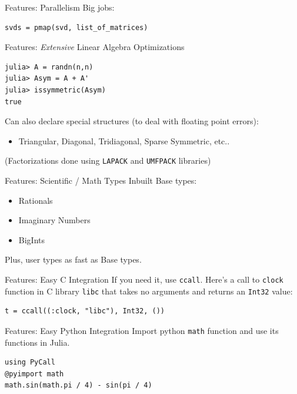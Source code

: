 \documentclass[11pt]{beamer}
\begin{document}
\begin{frame}[fragile]{Features: Parallelism}
Big jobs:
\begin{verbatim}
svds = pmap(svd, list_of_matrices)
\end{verbatim}
\end{frame}

\begin{frame}[fragile]{Features: \emph{Extensive} Linear Algebra Optimizations}
\begin{verbatim}
julia> A = randn(n,n)
julia> Asym = A + A'
julia> issymmetric(Asym)
true
\end{verbatim}
\pause
Can also declare special structures (to deal with floating point errors):
\begin{itemize}
    \item Triangular, Diagonal, Tridiagonal, Sparse Symmetric, etc..
\end{itemize}
\pause (Factorizations done using \texttt{LAPACK} and \texttt{UMFPACK} libraries)
\end{frame}

\begin{frame}[fragile]{Features: Scientific / Math Types Inbuilt}
Base types:
\begin{itemize}
    \item Rationals
    \item Imaginary Numbers
    \item BigInts
\end{itemize}
\pause
Plus, user types as fast as Base types.
\end{frame}

\begin{frame}[fragile]{Features: Easy C Integration}
If you need it, use \texttt{ccall}.
\pause
Here's a call to \texttt{clock} function in C library \texttt{libc} that takes no arguments and returns an \texttt{Int32} value:
\begin{verbatim}
t = ccall((:clock, "libc"), Int32, ())
\end{verbatim}
\end{frame}

\begin{frame}[fragile]{Features: Easy Python Integration}
Import python \texttt{math} function and use its functions in Julia.
\begin{verbatim}
using PyCall
@pyimport math
math.sin(math.pi / 4) - sin(pi / 4)
\end{verbatim}
\end{frame}
\end{document}
